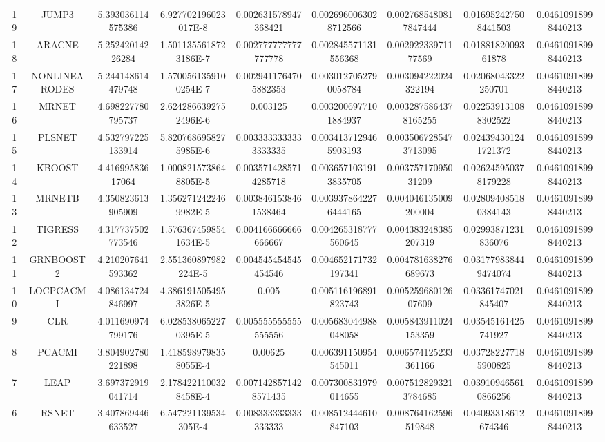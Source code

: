 \documentclass[a4paper,10pt]{article}
\begin{document}
\begin{landscape}
\begin{table}[!htp]
\begin{tabular}{ccccccccc}
19&JUMP3&5.393036114575386&6.927702196023017E-8&0.002631578947368421&0.0026960063028712566&0.0027685480817847444&0.016952427508441503&0.04610918998440213\\
18&ARACNE&5.25242014226284&1.5011355618723186E-7&0.002777777777777778&0.002845571131556368&0.00292233971177569&0.0188182009361878&0.04610918998440213\\
17&NONLINEARODES&5.244148614479748&1.5700561359100254E-7&0.0029411764705882353&0.0030127052790058784&0.003094222024322194&0.02068043322250701&0.04610918998440213\\
16&MRNET&4.698227780795737&2.6242866392752496E-6&0.003125&0.0032006977101884937&0.0032875864378165255&0.022539131088302522&0.04610918998440213\\
15&PLSNET&4.532797225133914&5.8207686958275985E-6&0.0033333333333333335&0.0034137129465903193&0.0035067285473713095&0.024394301241721372&0.04610918998440213\\
14&KBOOST&4.41699583617064&1.0008215738648805E-5&0.0035714285714285718&0.0036571031913835705&0.00375717095031209&0.026245950378179228&0.04610918998440213\\
13&MRNETB&4.350823613905909&1.3562712422469982E-5&0.0038461538461538464&0.0039378642276444165&0.004046135009200004&0.028094085180384143&0.04610918998440213\\
12&TIGRESS&4.317737502773546&1.5763674598541634E-5&0.004166666666666667&0.004265318777560645&0.004383248385207319&0.02993871231836076&0.04610918998440213\\
11&GRNBOOST2&4.210207641593362&2.551360897982224E-5&0.004545454545454546&0.004652171732197341&0.004781638276689673&0.031779838449474074&0.04610918998440213\\
10&LOCPCACMI&4.086134724846997&4.3861915054953826E-5&0.005&0.005116196891823743&0.00525968012607609&0.03361747021845407&0.04610918998440213\\
9&CLR&4.011690974799176&6.0285380652270395E-5&0.005555555555555556&0.005683044988048058&0.005843911024153359&0.03545161425741927&0.04610918998440213\\
8&PCACMI&3.804902780221898&1.4185989798358055E-4&0.00625&0.006391150954545011&0.006574125233361166&0.037282277185900825&0.04610918998440213\\
7&LEAP&3.697372919041714&2.1784221100328458E-4&0.0071428571428571435&0.007300831979014655&0.0075128293213784685&0.039109465610866256&0.04610918998440213\\
6&RSNET&3.407869446633527&6.547221139534305E-4&0.008333333333333333&0.008512444610847103&0.008764162596519848&0.04093318612674346&0.04610918998440213\\

\end{tabular}
\end{table}
\end{landscape}
\end{document}
